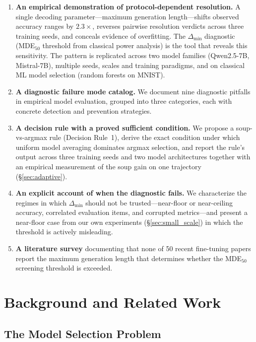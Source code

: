 \documentclass[pdflatex,sn-mathphys-ay,iicol]{sn-jnl}
\theoremstyle{thmstylethree}
\begin{document}
\begin{enumerate}
    \item \textbf{An empirical demonstration of protocol-dependent resolution.} A single decoding parameter---maximum generation length---shifts observed accuracy ranges by $2.3\times$, reverses pairwise resolution verdicts across three training seeds, and conceals evidence of overfitting. The $\Delta_{\min}$ diagnostic (MDE$_{50}$ threshold from classical power analysis) is the tool that reveals this sensitivity. The pattern is replicated across two model families (Qwen2.5-7B, Mistral-7B), multiple seeds, scales and training paradigms, and on classical ML model selection (random forests on MNIST).
    \item \textbf{A diagnostic failure mode catalog.} We document nine diagnostic pitfalls in empirical model evaluation, grouped into three categories, each with concrete detection and prevention strategies.
    \item \textbf{A decision rule with a proved sufficient condition.} We propose a soup-vs-argmax rule (Decision Rule~1), derive the exact condition under which uniform model averaging dominates argmax selection, and report the rule's output across three training seeds and two model architectures together with an empirical measurement of the soup gain on one trajectory (\S\ref{sec:adaptive}).
    \item \textbf{An explicit account of when the diagnostic fails.} We characterize the regimes in which $\Delta_{\min}$ should not be trusted---near-floor or near-ceiling accuracy, correlated evaluation items, and corrupted metrics---and present a near-floor case from our own experiments (\S\ref{sec:small_scale}) in which the threshold is actively misleading.
    \item \textbf{A literature survey} documenting that none of 50 recent fine-tuning papers report the maximum generation length that determines whether the MDE$_{50}$ screening threshold is exceeded.
\end{enumerate}

\section{Background and Related Work}\label{sec:background}

\subsection{The Model Selection Problem}
\end{document}
